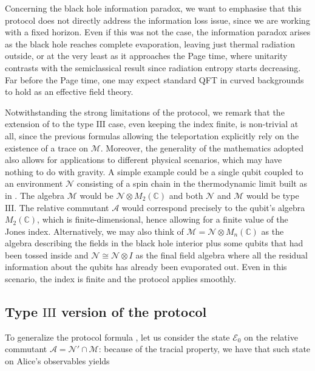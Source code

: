 \documentclass[a4paper,11pt]{article}
\begin{document}
Concerning the black hole information paradox, we want to emphasise that this protocol does not directly address the information loss issue, since we are working with a fixed horizon. Even if this was not the case, the information paradox arises as the black hole reaches complete evaporation, leaving just thermal radiation outside, or at the very least as it approaches the Page time, where unitarity contrasts with the semiclassical result since radiation entropy starts decreasing. Far before the Page time, one may expect standard QFT in curved backgrounds to hold as an effective field theory.

Notwithstanding the strong limitations of the protocol, we remark that the extension of \cite{Verlinde} to the type $\mathrm{III}$ case, even keeping the index finite, is non-trivial at all, since the previous formulas allowing the teleportation explicitly rely on the existence of a trace on $\mathcal{M}$. Moreover, the generality of the mathematics adopted also allows for applications to different physical scenarios, which may have nothing to do with gravity. A simple example could be a single qubit coupled to an environment $\mathcal{N}$ consisting of a spin chain in the thermodynamic limit built as in \cite{Witten}. The algebra $\mathcal{M}$ would be $\mathcal{N} \otimes M_2(\mathbb{C})$ and both $\mathcal{N}$ and $\mathcal{M}$ would be type $\mathrm{III}$. The relative commutant $\mathcal{A}$ would correspond precisely to the qubit's algebra $M_2(\mathbb{C})$, which is finite-dimensional, hence allowing for a finite value of the Jones index. Alternatively, we may also think of $\mathcal{M} = \mathcal{N} \otimes M_n(\mathbb{C})$ as the algebra describing the fields in the black hole interior plus some qubits that had been tossed inside and $\mathcal{N} \cong \mathcal{N} \otimes I$ as the final field algebra where all the residual information about the qubits has already been evaporated out. Even in this scenario, the index is finite and the protocol applies smoothly.

\subsection{Type $\mathrm{III}$ version of the protocol}

To generalize the protocol formula \cite{Verlinde}, let us consider the state $\mathcal{E}_0$ on the relative commutant $\mathcal{A} = \mathcal{N}' \cap \mathcal{M}$: because of the tracial property, we have that such state on Alice's observables yields
\end{document}
